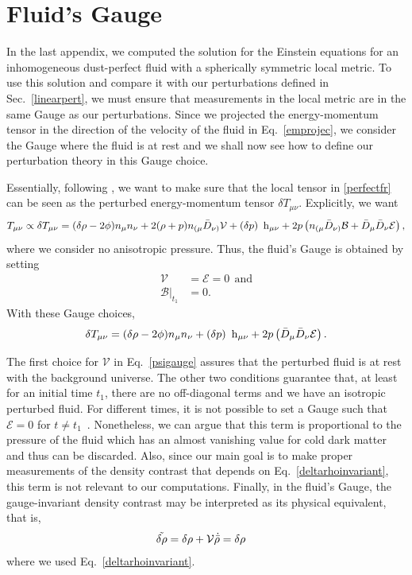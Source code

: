 \documentclass[a4paper,11pt]{article}
\begin{document}
\section{Fluid's Gauge}
\label{appgauge}

In the last appendix, we computed the solution for the Einstein equations for an
inhomogeneous dust-perfect fluid with a spherically symmetric local metric. To use this
solution and compare it with our perturbations defined in Sec.~\ref{linearpert}, we must
ensure that measurements in the local metric are in the same Gauge as our perturbations.
Since we projected the energy-momentum tensor in the direction of the velocity of the
fluid in Eq.~\eqref{emprojec}, we consider the Gauge where the fluid is at rest and we
shall now see how to define our perturbation theory in this Gauge choice.

Essentially, following \cite{Vitenti2014covariant}, we want to make sure that the local tensor in \eqref{perfectfr} can be seen as the perturbed energy-momentum tensor $\delta T_{\mu\nu}$. Explicitly, we want
\begin{align}
	T_{\mu \nu}\propto \delta T_{\mu \nu}=(\delta \rho-2 \phi) n_\mu n_\nu+2(\rho+p) n_{(\mu} \Bar{D}_{\nu)}\mathcal{V}+ \left(\delta p \right)\mathrm{~h}_{\mu \nu}+2 p\left(n_{(\mu} \Bar{D}_{\nu)}\mathcal{B}+\Bar{D}_\mu \Bar{D}_\nu \mathcal{E}\right)
	,\end{align}
where we consider no anisotropic pressure. Thus,
the fluid's Gauge is obtained by setting
\begin{align}
	\label{psigauge}
	\mathcal{V}             & = \mathcal{E}= 0 ~~\text{and} \\
	\mathcal{B}\rvert_{t_1} & = 0
	.\end{align}
With these Gauge choices,
\begin{align}
	\label{tensorconect}
	\delta T_{\mu \nu}=(\delta \rho-2 \phi) n_\mu n_\nu+ \left(\delta p \right)\mathrm{~h}_{\mu \nu}+2 p\left(\Bar{D}_\mu \Bar{D}_\nu \mathcal{E}\right)
	.\end{align}

The first choice for $\mathcal{V}$ in Eq.~\eqref{psigauge} assures that the perturbed
fluid is at rest with the background universe. The other two conditions guarantee that,
at least for an initial time $t_1$, there are no off-diagonal terms and we have an
isotropic perturbed fluid. For different times, it is not possible to set a Gauge such
that $\mathcal{E}=0$ for $t \neq t_1$~\cite{vitenti2012large}. Nonetheless, we can argue
that this term is proportional to the pressure of the fluid which has an almost
vanishing value for cold dark matter and thus can be discarded. Also, since our main
goal is to make proper measurements of the density contrast that depends on
Eq.~\eqref{deltarhoinvariant}, this term is not relevant to our computations. Finally,
in the fluid's Gauge, the gauge-invariant density contrast may be interpreted as its
physical equivalent, that is,
\begin{align}
	\label{physicalrho}
	\Tilde{\delta \rho} & = \delta \rho + \mathcal{V}\dot{\Bar{\rho}} = \delta \rho\end{align}
where we used Eq.~\eqref{deltarhoinvariant}.
\end{document}
